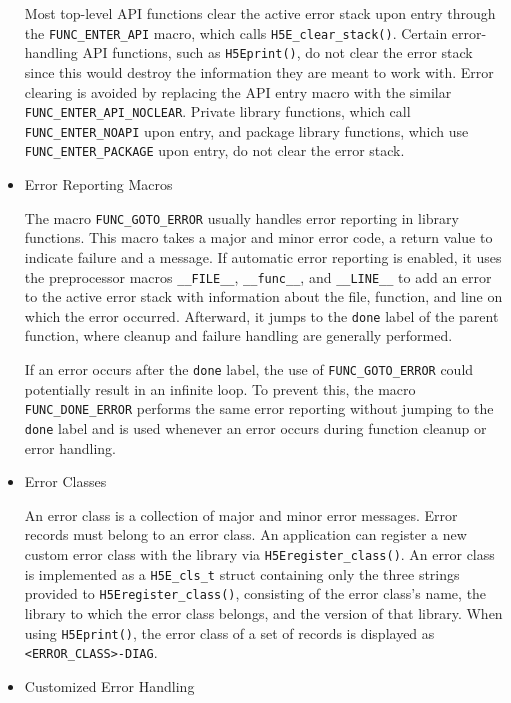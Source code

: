 \begin{itemize}
Most top-level API functions clear the active error stack upon entry through the \texttt{FUNC\_ENTER\_API} macro, which calls \texttt{H5E\_clear\_stack()}. Certain error-handling API functions, such as \texttt{H5Eprint()}, do not clear the error stack since this would destroy the information they are meant to work with. Error clearing is avoided by replacing the API entry macro with the similar \texttt{FUNC\_ENTER\_API\_NOCLEAR}. Private library functions, which call \texttt{FUNC\_ENTER\_NOAPI} upon entry, and package library functions, which use \texttt{FUNC\_ENTER\_PACKAGE} upon entry, do not clear the error stack.

\item Error Reporting Macros

The macro \texttt{FUNC\_GOTO\_ERROR} usually handles error reporting in library functions. This macro takes a major and minor error code, a return value to indicate failure and a message. If automatic error reporting is enabled, it uses the preprocessor macros \texttt{\_\_FILE\_\_}, \texttt{\_\_func\_\_}, and \texttt{\_\_LINE\_\_} to add an error to the active error stack with information about the file, function, and line on which the error occurred. Afterward, it jumps to the \texttt{done} label of the parent function, where cleanup and failure handling are generally performed.

If an error occurs after the \texttt{done} label, the use of \texttt{FUNC\_GOTO\_ERROR} could potentially result in an infinite loop. To prevent this, the macro \texttt{FUNC\_DONE\_ERROR} performs the same error reporting without jumping to the \texttt{done} label and is used whenever an error occurs during function cleanup or error handling.

\item Error Classes

An error class is a collection of major and minor error messages. Error records must belong to an error class. An application can register a new custom error class with the library via \texttt{H5Eregister\_class()}. An error class is implemented as a \texttt{H5E\_cls\_t} struct containing only the three strings provided to \texttt{H5Eregister\_class()}, consisting of the error class's name, the library to which the error class belongs, and the version of that library. When using \texttt{H5Eprint()}, the error class of a set of records is displayed as \texttt{<ERROR\_CLASS>-DIAG}. 

\item Customized Error Handling


\end{itemize}
